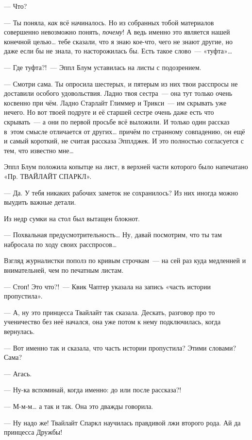 \documentclass[fontsize=11pt,a5paper,titlepage=firstcover]{scrbook}
\begin{document}
--- Что?

--- Ты поняла, \emph{как} всё начиналось. Но из собранных тобой материалов совершенно невозможно понять, \emph{почему}! А ведь именно это является нашей конечной целью{\ldots} тебе сказали, что я знаю кое-что, чего не знают другие, но даже если бы не знала, то насторожилась бы. Есть такое слово~--- «туфта»{\ldots}

--- Где туфта?!~--- Эппл Блум уставилась на листы с подозрением.

--- Смотри сама. Ты опросила шестерых, и пятерым из них твои расспросы не доставили особого удовольствия. Ладно твоя сестра~--- она тут только очень косвенно при чём. Ладно Старлайт Глиммер и Трикси~--- им скрывать уже нечего. Но вот твоей подруге и её старшей сестре очень даже есть что скрывать~--- а они по первой просьбе всё выложили. И только один рассказ в~этом смысле отличается от других{\ldots} причём по странному совпадению, он ещё и самый короткий, не считая рассказа Эпплджек. И это полностью согласуется с тем, что известно мне{\ldots}

Эппл Блум положила копытце на лист, в верхней части которого было напечатано «Пр. ТВАЙЛАЙТ СПАРКЛ».

--- Да. У тебя никаких рабочих заметок не сохранилось? Из них иногда можно выудить важные детали.

Из недр сумки на стол был вытащен блокнот.

--- Похвальная предусмотрительность{\ldots} Ну, давай посмотрим, что ты там набросала по ходу своих расспросов{\ldots}

Взгляд журналистки пополз по кривым строчкам~--- на сей раз куда медленней и внимательней, чем по печатным листам.

--- Стоп! Это что?!~--- Квик Чаптер указала на запись «часть истории пропустила».

--- А, ну это принцесса Твайлайт так сказала. Дескать, разговор про то ученичество без неё начался, она уже потом к нему подключилась, когда вернулась.

--- Вот именно так и сказала, что часть истории пропустила? Этими словами? Сама?

--- Агась.

--- Ну-ка вспоминай, когда именно: до или после рассказа?!

--- М-м-м{\ldots} а так и так. Она это дважды говорила.

--- Ну надо же! Твайлайт Спаркл научилась правдивой лжи второго рода. Ай да принцесса Дружбы!
\end{document}
